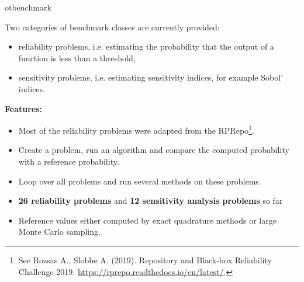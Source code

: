 \documentclass[aspectratio=169]{beamer}
\begin{document}

\begin{frame}{otbenchmark}

  Two categories of benchmark classes are currently provided:
  \begin{itemize}
    \item reliability problems, i.e. estimating the probability that the 
    output of a function is less than a threshold,
    \item sensitivity problems, i.e. estimating sensitivity indices, for 
    example Sobol' indices.
  \end{itemize}

  \textbf{Features:}
  \begin{itemize}
    \item Most of the reliability problems were adapted from the 
    RPRepo\footnote{See Rozsas A., Slobbe A. (2019). Repository and Black-box 
    Reliability Challenge 2019. 
    \url{https://rprepo.readthedocs.io/en/latest/}.}.
    
    \item Create a problem, run an algorithm and compare the computed 
    probability with a reference probability.

    \item Loop over all problems and run several methods on these problems.

    \item \textbf{26 reliability problems} and \textbf{12 sensitivity analysis 
    problems} so far

    \item Reference values either computed by exact quadrature methods or large 
    Monte Carlo sampling.
  \end{itemize}
\end{frame}
  
\end{document}
